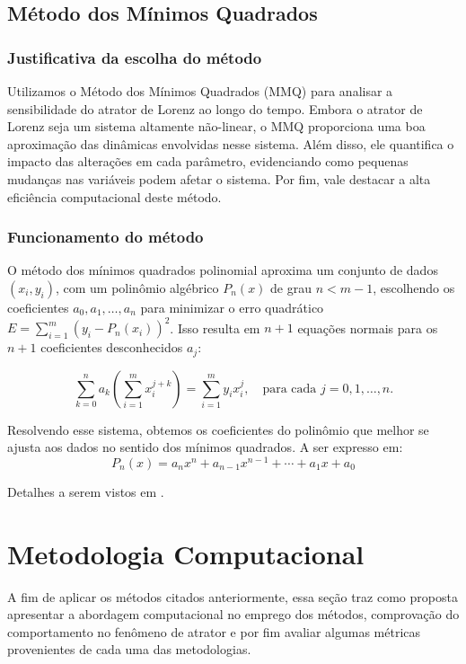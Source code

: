 \documentclass[12pt, a4paper]{article}
\begin{document}
\subsection{Método dos Mínimos Quadrados}
\subsubsection{Justificativa da escolha do método}
Utilizamos o Método dos Mínimos Quadrados (MMQ) para analisar a
sensibilidade do atrator de Lorenz ao longo do tempo. Embora o atrator de
Lorenz seja um sistema altamente não-linear, o MMQ proporciona uma boa
aproximação das dinâmicas envolvidas nesse sistema. Além disso, ele quantifica
o impacto das alterações em cada parâmetro, evidenciando como pequenas mudanças
nas variáveis podem afetar o sistema. Por fim, vale destacar a alta eficiência
computacional deste método.

\subsubsection{Funcionamento do método}
O método dos mínimos quadrados polinomial aproxima um conjunto de dados
$(x_i, y_i)$, com um polinômio algébrico $P_n(x)$ de grau $n < m - 1$,
escolhendo os coeficientes $a_0, a_1, \ldots, a_n$ para minimizar o erro
quadrático $E = \sum_{i=1}^m (y_i - P_n(x_i))^2$. Isso resulta em $n + 1$
equações normais para os $n + 1$ coeficientes desconhecidos $a_j$:

\begin{equation}
    \sum_{k=0}^n a_k \left(\sum_{i=1}^m x_i^{j+k}\right) = \sum_{i=1}^m y_i
    x_i^j, \quad \text{para cada } j = 0, 1, \ldots, n.
\end{equation}

Resolvendo esse sistema, obtemos os coeficientes do polinômio que melhor se
ajusta aos dados no sentido dos mínimos quadrados. A ser expresso em:
\begin{equation*}
    P_n(x) = a_nx^n + a_{n-1}x^{n-1} + \cdots + a_1x + a_0
\end{equation*}

Detalhes a serem vistos em \cite{burden2016}.
\newpage



\section{Metodologia Computacional}
A fim de aplicar os métodos citados anteriormente, essa seção traz como
proposta apresentar a abordagem computacional no emprego dos métodos,
comprovação do comportamento no fenômeno de atrator e por fim avaliar algumas
métricas provenientes de cada uma das metodologias.
\end{document}
